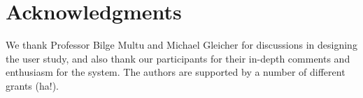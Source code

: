 \documentclass{sigchi}
\newcommand\tabhead[1]{\small\textbf{#1}}
\begin{document}


\section{Acknowledgments}

We thank Professor Bilge Multu and Michael Gleicher for discussions in designing the user study, and also thank our participants for their in-depth comments and enthusiasm for the system.  The authors are supported by a number of different grants (ha!).

%
%
%
%
%
\balance



\end{document}
